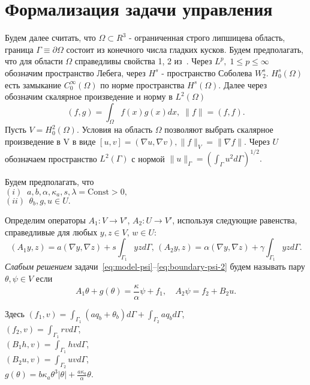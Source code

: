 \section{Формализация задачи управления}\label{sec:formalization}
Будем далее считать, что $\Omega \subset R^3$ - ограниченная строго липшицева область,
граница $\Gamma \equiv \partial \Omega$ состоит из конечного числа гладких кусков.
Будем предполагать, что для области $\Omega$ справедливы свойства 1, 2 из~\cite{}.
Через $L^p, \; 1 \leq p \leq \infty$ обозначим пространство Лебега, через $H^s$ - пространство Соболева $W^s_2$.
$H^s_0(\Omega)$ есть замыкание $C^\infty_0(\Omega)$ по норме пространства $H^s(\Omega)$.
Далее через обозначим скалярное произведение и норму в $L^2(\Omega)$
\[
    (f, g) = \int_\Omega f(x)g(x)dx, \; \| f \| = (f, f).
\]
Пусть $V = H^2_0(\Omega)$.
Условия на область $\Omega$ позволяют выбрать скалярное произведение в V в виде
$[u, v] = (\nabla u, \nabla v), \| f \|_V = \| \nabla f \|$.
Через $U$ обозначаем пространство $L^2(\Gamma)$ с нормой
$\|u\|_\Gamma=\left(\int_\Gamma u^2 d\Gamma\right)^{1/2}.$

Будем предполагать, что \\
$(i) \;\; a, b,\alpha,\kappa_a, s, \lambda = \textrm{Const} > 0,$ \\
$(ii) \;\, \theta_b, g, u \in U.$

Определим операторы $A_1\colon V \to V'$, $A_2\colon U \to V'$, используя
следующие равенства, справедливые для любых $y,z \in V$, $w\in U$:
\[
    (A_1 y,z) = a(\nabla y, \nabla z) + s\int_{\Gamma_1} yz d\Gamma, \,
    (A_2 y, z) = \alpha (\nabla y, \nabla z) + \gamma \int_{\Gamma_1} yz d\Gamma.
\]
\textit{Слабым решением} задачи~\eqref{eq:model-psi}--\eqref{eq:boundary-psi-2} будем называть
пару $\theta, \psi \in V$ если
\begin{equation}
    \label{eq:weak}
    A_1\theta  + g(\theta) = \frac{\kappa}{\alpha} \psi + f_1, \quad
    A_2\psi = f_2 + B_2 u.
\end{equation}

Здесь
$(f_1, v) = \int_{\Gamma_1} (a q_b + \theta_b)d\Gamma + \int_{\Gamma_2} a q_b d\Gamma$,\\
$(f_2, v) = \int_{\Gamma_1} r v d\Gamma$,\\
$(B_1 h,v) = \int_{\Gamma_1} h v d\Gamma$,\\
$(B_2 u, v) = \int_{\Gamma_2} u v d\Gamma$,\\
$g(\theta) = b\kappa_a \theta^3 |\theta| + \frac{a\kappa_a}{\alpha}\theta$.

